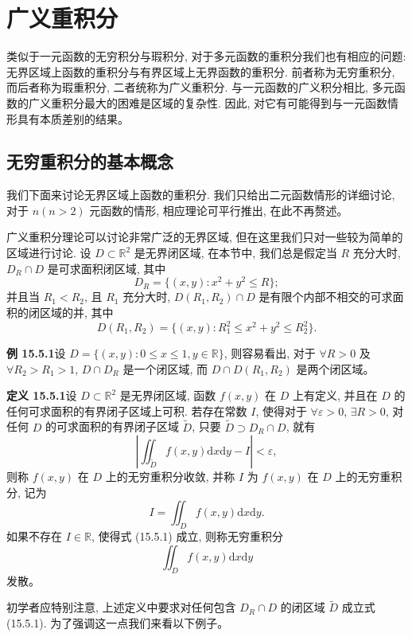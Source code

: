 \documentclass[UTF8, 12pt, fontset=fandol, oneside]{ctexart}
\begin{document}
\section{广义重积分}

类似于一元函数的无穷积分与瑕积分, 对于多元函数的重积分我们也有相应的问题: 无界区域上函数的重积分与有界区域上无界函数的重积分. 前者称为无穷重积分, 而后者称为瑕重积分, 二者统称为广义重积分. 与一元函数的广义积分相比, 多元函数的广义重积分最大的困难是区域的复杂性. 因此, 对它有可能得到与一元函数情形具有本质差别的结果。

\subsection{无穷重积分的基本概念}

我们下面来讨论无界区域上函数的重积分. 我们只给出二元函数情形的详细讨论, 对于 $n(n>2)$ 元函数的情形, 相应理论可平行推出, 在此不再赘述。

广义重积分理论可以讨论非常广泛的无界区域, 但在这里我们只对一些较为简单的区域进行讨论. 设 $D\subset\mathbb R^2$ 是无界闭区域, 在本节中, 我们总是假定当 $R$ 充分大时, $D_R\cap D$ 是可求面积闭区域, 其中
\[
  D_R=\{(x,y):x^2+y^2\leqslant R\};
\]
并且当 $R_1<R_2$, 且 $R_1$ 充分大时, $D(R_1,R_2)\cap D$ 是有限个内部不相交的可求面积的闭区域的并, 其中
\[
  D(R_1,R_2)=\{(x,y):R_1^2\leqslant x^2+y^2\leqslant R_2^2\}.
\]

\noindent\textbf{例 15.5.1}\quad 设 $D=\{(x,y):0\leqslant x\leqslant1,y\in\mathbb R\}$, 则容易看出, 对于 $\forall R>0$ 及 $\forall R_2>R_1>1$, $D\cap D_R$ 是一个闭区域, 而 $D\cap D(R_1,R_2)$ 是两个闭区域。

\noindent\textbf{定义 15.5.1}\quad 设 $D\subset\mathbb R^2$ 是无界闭区域, 函数 $f(x,y)$ 在 $D$ 上有定义, 并且在 $D$ 的任何可求面积的有界闭子区域上可积. 若存在常数 $I$, 使得对于 $\forall\varepsilon>0$, $\exists R>0$, 对任何 $D$ 的可求面积的有界闭子区域 $\widetilde D$, 只要 $\widetilde D\supset D_R\cap D$, 就有
\begin{equation}
  \left|\iint_{\widetilde D}f(x,y)\mathrm dx\mathrm dy-I\right|<\varepsilon,
  \tag{15.5.1}
\end{equation}
则称 $f(x,y)$ 在 $D$ 上的无穷重积分收敛, 并称 $I$ 为 $f(x,y)$ 在 $D$ 上的无穷重积分, 记为
\[
  I=\iint_D f(x,y)\mathrm dx\mathrm dy.
\]
如果不存在 $I\in\mathbb R$, 使得式 (15.5.1) 成立, 则称无穷重积分
\[
  \iint_D f(x,y)\mathrm dx\mathrm dy
\]
发散。

初学者应特别注意, 上述定义中要求对任何包含 $D_R\cap D$ 的闭区域 $\widetilde D$ 成立式 (15.5.1). 为了强调这一点我们来看以下例子。
\end{document}
